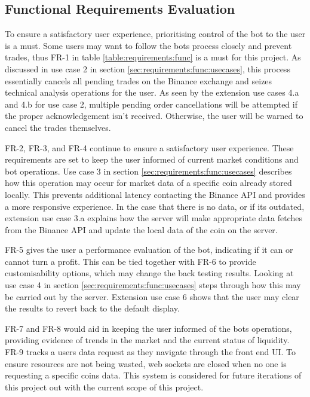 \subsection{Functional Requirements Evaluation}
\noindent 

\noindent To ensure a satisfactory user experience, prioritising control of the bot to the user is a must. Some users may want to follow the bots process closely and prevent trades, thus FR-1 in table \ref{table:requirements:func} is a must for this project. As discussed in use case 2 in section \ref{sec:requirements:func:usecases}, this process essentially cancels all pending trades on the Binance exchange and seizes technical analysis operations for the user. As seen by the extension use cases 4.a and 4.b for use case 2, multiple pending order cancellations will be attempted if the proper acknowledgement isn't received. Otherwise, the user will be warned to cancel the trades themselves.

FR-2, FR-3, and FR-4 continue to ensure a satisfactory user experience. These requirements are set to keep the user informed of current market conditions and bot operations. Use case 3 in section \ref{sec:requirements:func:usecases} describes how this operation may occur for market data of a specific coin already stored locally. This prevents additional latency contacting the Binance API and provides a more responsive experience. In the case that there is no data, or if its outdated, extension use case 3.a explains how the server will make appropriate data fetches from the Binance API and update the local data of the coin on the server.

FR-5 gives the user a performance evaluation of the bot, indicating if it can or cannot turn a profit. This can be tied together with FR-6 to provide customisability options, which may change the back testing results. Looking at use case 4 in section \ref{sec:requirements:func:usecases} steps through how this may be carried out by the server. Extension use case 6 shows that the user may clear the results to revert back to the default display. 

FR-7 and FR-8 would aid in keeping the user informed of the bots operations, providing evidence of trends in the market and the current status of liquidity. FR-9 tracks a users data request as they navigate through the front end UI. To ensure resources are not being wasted, web sockets are closed when no one is requesting a specific coins data. This system is considered for future iterations of this project out with the current scope of this project.  

